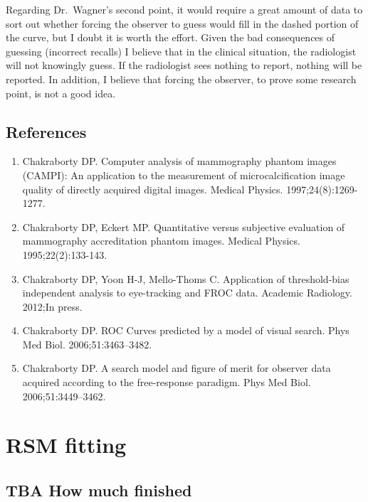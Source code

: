 \documentclass[
]{book}
\providecommand{\tightlist}{%
  \setlength{\itemsep}{0pt}\setlength{\parskip}{0pt}}
\begin{document}
Regarding Dr.~Wagner's second point, it would require a great amount of data to sort out whether forcing the observer to guess would fill in the dashed portion of the curve, but I doubt it is worth the effort. Given the bad consequences of guessing (incorrect recalls) I believe that in the clinical situation, the radiologist will not knowingly guess. If the radiologist sees nothing to report, nothing will be reported. In addition, I believe that forcing the observer, to prove some research point, is not a good idea.

\hypertarget{rsm-goodbye-froc-references}{%
\section{References}\label{rsm-goodbye-froc-references}}

\begin{enumerate}
\def\labelenumi{\arabic{enumi}.}
\tightlist
\item
  Chakraborty DP. Computer analysis of mammography phantom images (CAMPI): An application to the measurement of microcalcification image quality of directly acquired digital images. Medical Physics. 1997;24(8):1269-1277.
\item
  Chakraborty DP, Eckert MP. Quantitative versus subjective evaluation of mammography accreditation phantom images. Medical Physics. 1995;22(2):133-143.
\item
  Chakraborty DP, Yoon H-J, Mello-Thoms C. Application of threshold-bias independent analysis to eye-tracking and FROC data. Academic Radiology. 2012;In press.
\item
  Chakraborty DP. ROC Curves predicted by a model of visual search. Phys Med Biol. 2006;51:3463--3482.
\item
  Chakraborty DP. A search model and figure of merit for observer data acquired according to the free-response paradigm. Phys Med Biol. 2006;51:3449--3462.
\end{enumerate}

\hypertarget{rsm-fitting}{%
\chapter{RSM fitting}\label{rsm-fitting}}

\hypertarget{rsm-fitting-how-much-finished}{%
\section{TBA How much finished}\label{rsm-fitting-how-much-finished}}
\end{document}
